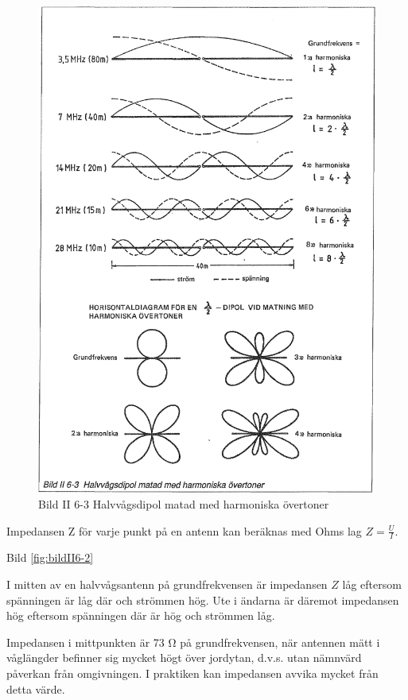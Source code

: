 \begin{figure}
  \includegraphics[width=\textwidth]{images/bild_2_6-03}
  \caption{Bild II 6-3 Halvvågsdipol matad med harmoniska övertoner}
  \label{fig:bildII6-3}
\end{figure}

Impedansen Z för varje punkt på en antenn kan beräknas med Ohms lag
\(Z = \frac{U}{I}\).

Bild \ref{fig:bildII6-2}

I mitten av en halvvågsantenn på grundfrekvensen är impedansen \(Z\)
låg eftersom spänningen är låg där och strömmen hög.  Ute i ändarna är
däremot impedansen hög eftersom spänningen där är hög och strömmen
låg.

Impedansen i mittpunkten är 73 Ω på grundfrekvensen, när antennen mätt
i våglängder befinner sig mycket högt över jordytan, d.v.s. utan
nämnvärd påverkan från omgivningen. I praktiken kan impedansen avvika
mycket från detta värde.

